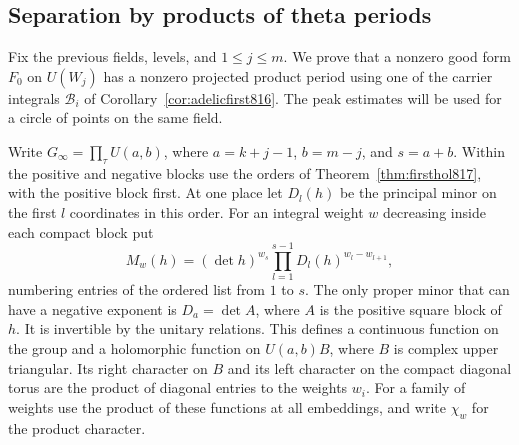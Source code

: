 \documentclass[a4paper,11pt]{article}
\theoremstyle{definition}
\theoremstyle{remark}
\numberwithin{equation}{section}
\begin{document}
\subsection{Separation by products of theta periods}
\label{sec:complexseparation818}
Fix the previous fields, levels, and \(1\le j\le m\).
We prove that a nonzero good form \(F_0\) on \(U(W_j)\)
has a nonzero projected product period using one of the
carrier integrals \(\mathcal B_i\) of
Corollary~\ref{cor:adelicfirst816}. The peak estimates will
be used for a circle of points on the same field.

Write \(G_\infty=\prod_{\tau}U(a,b)\), where \(a=k+j-1\),
\(b=m-j\), and \(s=a+b\). Within the positive and
negative blocks use the orders of Theorem~\ref{thm:firsthol817},
with the positive block first. At one place let \(D_l(h)\)
be the principal minor on the first \(l\) coordinates
in this order. For an integral weight \(w\) decreasing
inside each compact block put
\[
     M_w(h)=(\det h)^{w_s}
                 \prod_{l=1}^{s-1}D_l(h)^{w_l-w_{l+1}},
\]
numbering entries of the ordered list from \(1\) to \(s\).
The only proper minor that can have a negative exponent is
\(D_a=\det A\), where \(A\) is the positive square block of
\(h\). It is invertible by the unitary relations. This
defines a continuous function on the group and a holomorphic
function on \(U(a,b)B\), where \(B\) is complex upper
triangular. Its right character on \(B\) and its left
character on the compact diagonal torus are the product of
diagonal entries to the weights \(w_i\). For a family of
weights use the product of these functions at all embeddings,
and write \(\chi_w\) for the product character.
\end{document}
